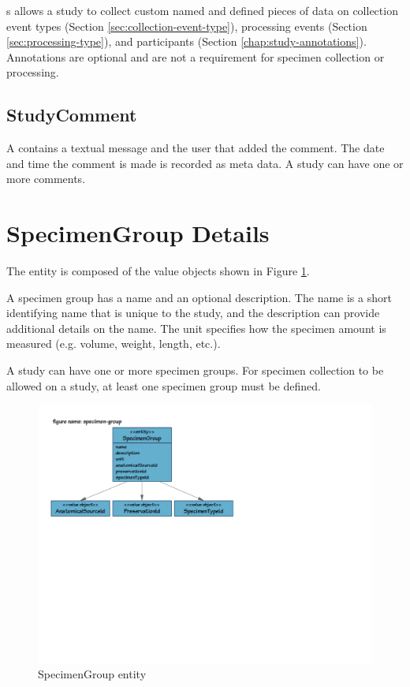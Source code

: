s allows a study to collect custom named and
defined pieces of data on collection event types (Section
\ref{sec:collection-event-type}), processing events (Section
\ref{sec:processing-type}), and participants (Section
\ref{chap:study-annotations}). Annotations are optional and are not a
requirement for specimen collection or processing.

\subsection*{StudyComment}
A  contains a textual message and the user that
added the comment. The date and time the comment is made is recorded as meta
data. A study can have one or more comments.

\section{SpecimenGroup Details}
\label{sec:specimen-group}

The  entity is composed of the value objects shown
in Figure \ref{fig:specimen-group}.

A specimen group has a name and an optional description. The name is a short
identifying name that is unique to the study, and the description can provide
additional details on the name. The unit specifies how the specimen amount is
measured (e.g. volume, weight, length, etc.).

A study can have one or more specimen groups. For specimen collection to be
allowed on a study, at least one specimen group must be defined.

\begin{figure}[H]
  \centering
  \includegraphics[trim={9mm 120mm 80mm 18mm}, clip,
    width=1\textwidth]{images/specimen-group}
  \caption{SpecimenGroup entity}
  \label{fig:specimen-group}
\end{figure}

